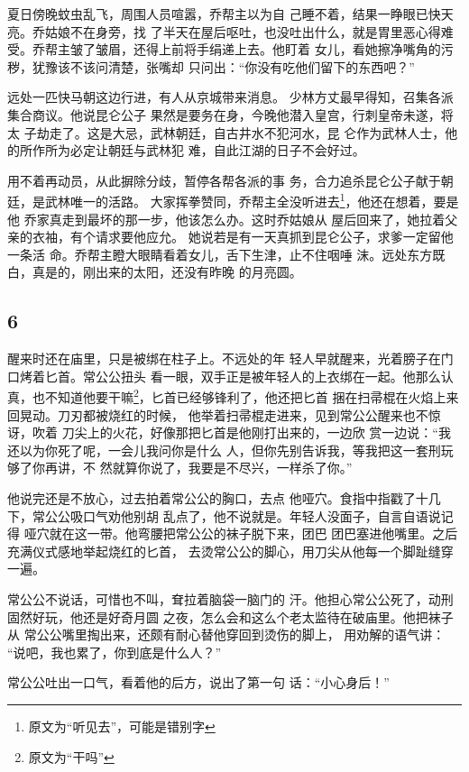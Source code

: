 夏日傍晚蚊虫乱飞，周围人员喧嚣，乔帮主以为自
己睡不着，结果一睁眼已快天亮。乔姑娘不在身旁，找
了半天在屋后呕吐，也没吐出什么，就是胃里恶心得难
受。乔帮主皱了皱眉，还得上前将手绢递上去。他盯着
女儿，看她擦净嘴角的污秽，犹豫该不该问清楚，张嘴却
只问出：“你没有吃他们留下的东西吧？”

远处一匹快马朝这边行进，有人从京城带来消息。
少林方丈最早得知，召集各派集合商议。他说昆仑公子
果然是要务在身，今晚他潜入皇宫，行刺皇帝未遂，将太
子劫走了。这是大忌，武林朝廷，自古井水不犯河水，昆
仑作为武林人士，他的所作所为必定让朝廷与武林犯
难，自此江湖的日子不会好过。

用不着再动员，从此摒除分歧，暂停各帮各派的事
务，合力追杀昆仑公子献于朝廷，是武林唯一的活路。
大家挥拳赞同，乔帮主全没听进去\footnote{原文为“听见去”，可能是错别字}，他还在想着，要是他
乔家真走到最坏的那一步，他该怎么办。这时乔姑娘从
屋后回来了，她拉着父亲的衣袖，有个请求要他应允。
她说若是有一天真抓到昆仑公子，求爹一定留他一条活
命。乔帮主瞪大眼睛看着女儿，舌下生津，止不住咽唾
沫。远处东方既白，真是的，刚出来的太阳，还没有昨晚
的月亮圆。
\newline

{\centering\subsection{6}}

醒来时还在庙里，只是被绑在柱子上。不远处的年
轻人早就醒来，光着膀子在门口烤着匕首。常公公扭头
看一眼，双手正是被年轻人的上衣绑在一起。他那么认
真，也不知道他要干嘛\footnote{原文为“干吗”}，匕首已经够锋利了，他还把匕首
捆在扫帚棍在火焰上来回晃动。刀刃都被烧红的时候，
他举着扫帚棍走进来，见到常公公醒来也不惊讶，吹着
刀尖上的火花，好像那把匕首是他刚打出来的，一边欣
赏一边说：“我还以为你死了呢，一会儿我问你是什么
人，但你先别告诉我，等我把这一套刑玩够了你再讲，不
然就算你说了，我要是不尽兴，一样杀了你。”

他说完还是不放心，过去拍着常公公的胸口，去点
他哑穴。食指中指戳了十几下，常公公吸口气劝他别胡
乱点了，他不说就是。年轻人没面子，自言自语说记得
哑穴就在这一带。他弯腰把常公公的袜子脱下来，团巴
团巴塞进他嘴里。之后充满仪式感地举起烧红的匕首，
去烫常公公的脚心，用刀尖从他每一个脚趾缝穿一遍。

常公公不说话，可惜也不叫，耷拉着脑袋一脑门的
汗。他担心常公公死了，动刑固然好玩，他还是好奇月圆
之夜，怎么会和这么个老太监待在破庙里。他把袜子从
常公公嘴里掏出来，还颇有耐心替他穿回到烫伤的脚上，
用劝解的语气讲： “说吧，我也累了，你到底是什么人？”

常公公吐出一口气，看着他的后方，说出了第一句
话：“小心身后！”

